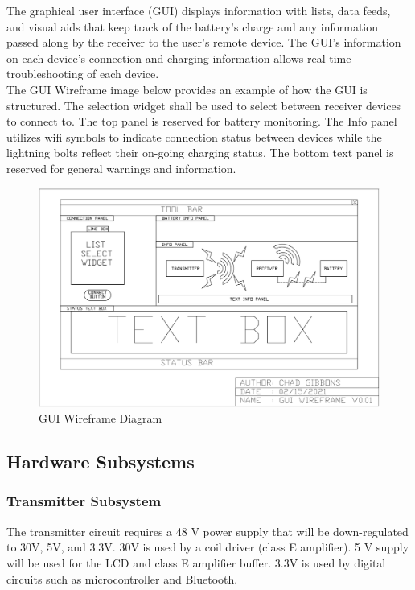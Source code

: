 \documentclass[12pt]{article}
\begin{document}
\hfill
\pagebreak

The graphical user interface (GUI) displays information with lists, data feeds, and visual aids that keep track of the battery’s charge and any information passed along by the receiver to the user’s remote device.   The GUI’s information on each device’s connection and charging information allows real-time troubleshooting of each device.\\

\indent
The GUI Wireframe image below provides an example of how the GUI is structured.  The selection widget shall be used to select between receiver devices to connect to.  The top panel is reserved for battery monitoring.  The Info panel utilizes wifi symbols to indicate connection status between devices while the lightning bolts reflect their on-going charging status.  The bottom text panel is reserved for general warnings and information.\\

\hfill

\begin{figure}[h!]
\centering
\includegraphics[width=0.88\linewidth]{gui_wireframe}
\caption{GUI Wireframe Diagram}
\end{figure}

\hfill

\pagebreak

\subsection{Hardware Subsystems}

\subsubsection{Transmitter Subsystem} The transmitter circuit requires a 48 V power supply that will be down-regulated to 30V, 5V, and 3.3V.  30V is used by a coil driver (class E amplifier).  5 V supply will be used for the LCD and class E amplifier buffer.  3.3V is used by digital circuits such as microcontroller and Bluetooth.\\
\end{document}
